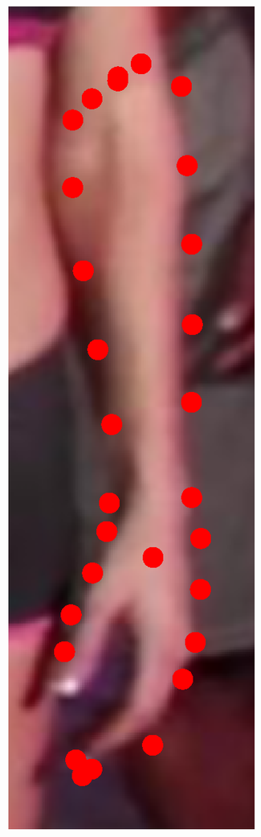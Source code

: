 \begin{figure}[!t]
    \includegraphics[height=\ofh]{resources/Fittings/35.eps}
    \hfill

\end{figure}
